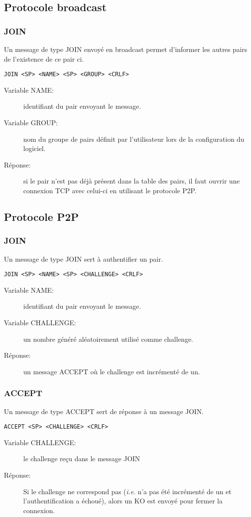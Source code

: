 \subsection{Protocole broadcast}
\subsubsection*{JOIN}
Un message de type JOIN envoyé en broadcast permet d'informer les autres
pairs de l'existence de ce pair ci.
\begin{verbatim}
JOIN <SP> <NAME> <SP> <GROUP> <CRLF>
\end{verbatim}
\begin{description}
\item[Variable NAME:] identifiant du pair envoyant le message.
\item[Variable GROUP:] nom du groupe de pairs définit par l'utilisateur
  lors de la configuration du logiciel.
\item[Réponse:] si le pair n'est pas déjà présent dans la table des pairs,
  il faut ouvrir une connexion TCP avec celui-ci en utilisant le protocole P2P.
\end{description}

\subsection{Protocole P2P}
\subsubsection*{JOIN}
Un message de type JOIN sert à authentifier un pair.
\begin{verbatim}
JOIN <SP> <NAME> <SP> <CHALLENGE> <CRLF>
\end{verbatim}
\begin{description}
\item[Variable NAME:] identifiant du pair envoyant le message.
\item[Variable CHALLENGE:] un nombre généré aléatoirement utilisé comme
  challenge.
\item[Réponse:] un message ACCEPT où le challenge est incrémenté de un.
\end{description}

\hrulefill

\subsubsection*{ACCEPT}
Un message de type ACCEPT sert de réponse à un message JOIN.
\begin{verbatim}
ACCEPT <SP> <CHALLENGE> <CRLF>
\end{verbatim}
\begin{description}
\item[Variable CHALLENGE:] le challenge reçu dans le message JOIN
\item[Réponse:] Si le challenge ne correspond pas (\emph{i.e.} n'a pas été
  incrémenté de un et l'authentification a échoué), alors un KO est envoyé
  pour fermer la connexion.
\end{description}

